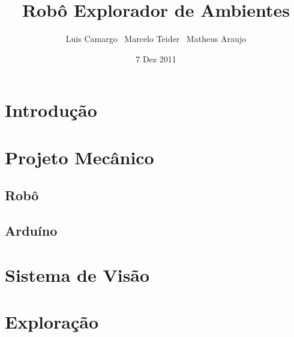 \documentclass{beamer}
\begin{document}
	\title{Robô Explorador de Ambientes}
	\author{Luis Camargo \newline \  Marcelo Teider \newline \  Matheus Araujo}

	\date{7 Dez 2011}

	\frame{\titlepage}

	\section{Introdução}
	
	
	\section{Projeto Mecânico}


		\subsection{Robô}


		\subsection{Arduíno}



	\section{Sistema de Visão}
	

	\section{Exploração}
	
\end{document}
